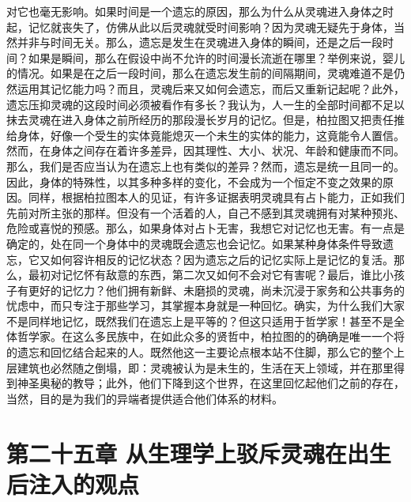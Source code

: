 对它也毫无影响。如果时间是一个遗忘的原因，那么为什么从灵魂进入身体之时起，记忆就丧失了，仿佛从此以后灵魂就受时间影响？因为灵魂无疑先于身体，当然并非与时间无关。那么，遗忘是发生在灵魂进入身体的瞬间，还是之后一段时间？如果是瞬间，那么在假设中尚不允许的时间漫长流逝在哪里？举例来说，婴儿的情况。如果是在之后一段时间，那么在遗忘发生前的间隔期间，灵魂难道不是仍然运用其记忆能力吗？而且，灵魂后来又如何会遗忘，而后又重新记起呢？此外，遗忘压抑灵魂的这段时间必须被看作有多长？我认为，人一生的全部时间都不足以抹去灵魂在进入身体之前所经历的那段漫长岁月的记忆。\newline{}\newline{}但是，柏拉图又把责任推给身体，好像一个受生的实体竟能熄灭一个未生的实体的能力，这竟能令人置信。然而，在身体之间存在着许多差异，因其理性、大小、状况、年龄和健康而不同。那么，我们是否应当认为在遗忘上也有类似的差异？然而，遗忘是统一且同一的。因此，身体的特殊性，以其多种多样的变化，不会成为一个恒定不变之效果的原因。同样，根据柏拉图本人的见证，有许多证据表明灵魂具有占卜能力，正如我们先前对所主张的那样。但没有一个活着的人，自己不感到其灵魂拥有对某种预兆、危险或喜悦的预感。那么，如果身体对占卜无害，我想它对记忆也无害。有一点是确定的，处在同一个身体中的灵魂既会遗忘也会记忆。如果某种身体条件导致遗忘，它又如何容许相反的记忆状态？因为遗忘之后的记忆实际上是记忆的复活。那么，最初对记忆怀有敌意的东西，第二次又如何不会对它有害呢？\newline{}\newline{}最后，谁比小孩子有更好的记忆力？他们拥有新鲜、未磨损的灵魂，尚未沉浸于家务和公共事务的忧虑中，而只专注于那些学习，其掌握本身就是一种回忆。确实，为什么我们大家不是同样地记忆，既然我们在遗忘上是平等的？但这只适用于哲学家！甚至不是全体哲学家。在这么多民族中，在如此众多的贤哲中，柏拉图的的确确是唯一一个将的遗忘和回忆结合起来的人。既然他这一主要论点根本站不住脚，那么它的整个上层建筑也必然随之倒塌，即：灵魂被认为是未生的，生活在天上领域，并在那里得到神圣奥秘的教导；此外，他们下降到这个世界，在这里回忆起他们之前的存在，当然，目的是为我们的异端者提供适合他们体系的材料。\par


\section{第二十五章 从生理学上驳斥灵魂在出生后注入的观点}

